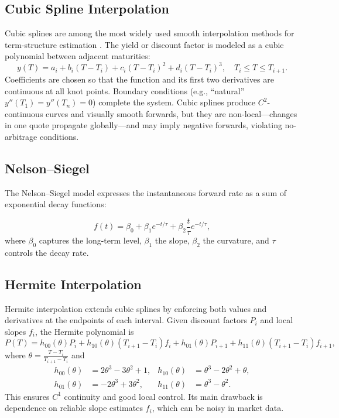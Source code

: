 \documentclass[12pt]{report}
\begin{document}
\subsection{Cubic Spline Interpolation}

Cubic splines are among the most widely used smooth interpolation methods for term-structure estimation \parencite{McCulloch1975,deBoor1978}.  
The yield or discount factor is modeled as a cubic polynomial between adjacent maturities:
\[
y(T) = a_i + b_i (T-T_i) + c_i (T-T_i)^2 + d_i (T-T_i)^3,
\quad T_i \le T \le T_{i+1}.
\]
Coefficients are chosen so that the function and its first two derivatives are continuous at all knot points.  
Boundary conditions (e.g., “natural” \(y''(T_1)=y''(T_n)=0\)) complete the system.  
Cubic splines produce \(C^2\)-continuous curves and visually smooth forwards, but they are non-local—changes in one quote propagate globally—and may imply negative forwards, violating no-arbitrage conditions.


\subsection{Nelson–Siegel}
The Nelson–Siegel model \parencite{NelsonSiegel1987} expresses the instantaneous forward rate as a sum of exponential decay functions:

\[
f(t) = \beta_0 + \beta_1 e^{-t/\tau} + \beta_2 \frac{t}{\tau} e^{-t/\tau},
\]
where \(\beta_0\) captures the long-term level, \(\beta_1\) the slope, \(\beta_2\) the curvature, and \(\tau\) controls the decay rate.


\subsection{Hermite Interpolation}

Hermite interpolation extends cubic splines by enforcing both values and derivatives at the endpoints of each interval.  
Given discount factors \(P_i\) and local slopes \(f_i\), the Hermite polynomial is
\[
P(T) = h_{00}(\theta)P_i + h_{10}(\theta)(T_{i+1}-T_i)f_i
      + h_{01}(\theta)P_{i+1} + h_{11}(\theta)(T_{i+1}-T_i)f_{i+1},
\]
where \(\theta = \frac{T-T_i}{T_{i+1}-T_i}\) and
\[
\begin{aligned}
h_{00}(\theta)&=2\theta^3-3\theta^2+1,&
h_{10}(\theta)&=\theta^3-2\theta^2+\theta,\\
h_{01}(\theta)&=-2\theta^3+3\theta^2,&
h_{11}(\theta)&=\theta^3-\theta^2.
\end{aligned}
\]
This ensures \(C^1\) continuity and good local control.  
Its main drawback is dependence on reliable slope estimates \(f_i\), which can be noisy in market data.
\end{document}
